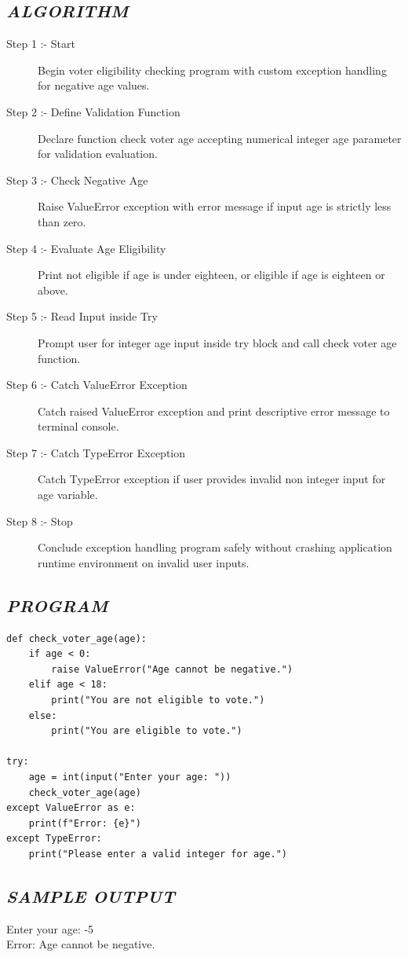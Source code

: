 \documentclass[11pt,a4paper]{article}
\begin{document}
\subsection*{\textit{ALGORITHM}}
\begin{description}
  \item[Step 1 :- Start] Begin voter eligibility checking program with custom exception handling for negative age values.
  \item[Step 2 :- Define Validation Function] Declare function check voter age accepting numerical integer age parameter for validation evaluation.
  \item[Step 3 :- Check Negative Age] Raise ValueError exception with error message if input age is strictly less than zero.
  \item[Step 4 :- Evaluate Age Eligibility] Print not eligible if age is under eighteen, or eligible if age is eighteen or above.
  \item[Step 5 :- Read Input inside Try] Prompt user for integer age input inside try block and call check voter age function.
  \item[Step 6 :- Catch ValueError Exception] Catch raised ValueError exception and print descriptive error message to terminal console.
  \item[Step 7 :- Catch TypeError Exception] Catch TypeError exception if user provides invalid non integer input for age variable.
  \item[Step 8 :- Stop] Conclude exception handling program safely without crashing application runtime environment on invalid user inputs.
\end{description}

\subsection*{\textit{PROGRAM}}
\begin{lstlisting}[style=pythonstyle]
def check_voter_age(age): 
    if age < 0: 
        raise ValueError("Age cannot be negative.") 
    elif age < 18: 
        print("You are not eligible to vote.") 
    else: 
        print("You are eligible to vote.") 

try: 
    age = int(input("Enter your age: ")) 
    check_voter_age(age) 
except ValueError as e: 
    print(f"Error: {e}") 
except TypeError: 
    print("Please enter a valid integer for age.")
\end{lstlisting}

\subsection*{\textit{SAMPLE OUTPUT}}
\begin{tcolorbox}[colback=black!85,colframe=navyblue,title=\textbf{Terminal Output},coltitle=white,fonttitle=\bfseries\small]
\small\ttfamily\color{green!30!white}
Enter your age: -5\\
Error: Age cannot be negative.
\end{tcolorbox}
\end{document}
